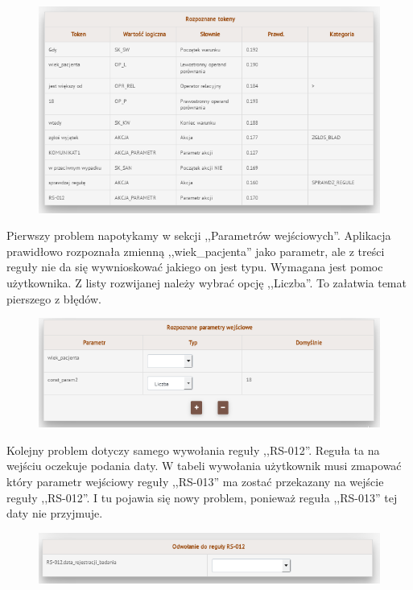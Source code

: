\begin{figure}[H]
	\centering
	\includegraphics[scale=0.8]{img/app-eksperymenty/p4-2.png}
\end{figure}

Pierwszy problem napotykamy w sekcji ,,Parametrów wejściowych''. Aplikacja prawidłowo rozpoznała zmienną ,,wiek\_pacjenta'' jako parametr, ale z treści reguły nie da się wywnioskować jakiego on jest typu. Wymagana jest pomoc użytkownika. Z listy rozwijanej należy wybrać opcję ,,Liczba''. To załatwia temat pierszego z błędów.
\begin{figure}[H]
	\centering
	\includegraphics[scale=0.8]{img/app-eksperymenty/p4-3.png}
\end{figure}

Kolejny problem dotyczy samego wywołania reguły ,,RS-012''. Reguła ta na wejściu oczekuje podania daty. W tabeli wywołania użytkownik musi zmapować który parametr wejściowy reguły ,,RS-013'' ma zostać przekazany na wejście reguły ,,RS-012''. I tu pojawia się nowy problem, ponieważ reguła ,,RS-013'' tej daty nie przyjmuje. 

\begin{figure}[H]
	\centering
	\includegraphics[scale=0.8]{img/app-eksperymenty/p4-4.png}
\end{figure}

